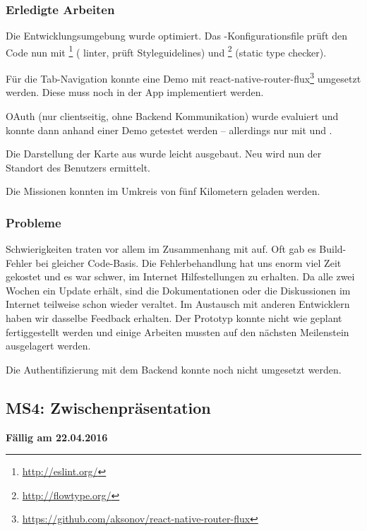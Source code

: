\subsubsection{Erledigte Arbeiten}
Die Entwicklungsumgebung wurde optimiert. Das -Konfigurationsfile prüft den Code nun mit \footnote{\url{http://eslint.org/}} ( linter, prüft Styleguidelines) und \footnote{\url{http://flowtype.org/}} (static type checker). 

Für die Tab-Navigation konnte eine Demo mit react-native-router-flux\footnote{\url{https://github.com/aksonov/react-native-router-flux}} umgesetzt werden. Diese muss noch in der \kort{} App implementiert werden. 

\gls{OAuth} (nur clientseitig, ohne Backend Kommunikation) wurde evaluiert und konnte dann anhand einer Demo getestet werden -- allerdings nur mit  und .

Die Darstellung der Karte aus  wurde leicht ausgebaut. Neu wird nun der Standort des Benutzers ermittelt.

Die Missionen konnten im Umkreis von fünf Kilometern geladen werden.

\subsubsection{Probleme}
Schwierigkeiten traten vor allem im Zusammenhang mit  auf.
Oft gab es Build-Fehler bei gleicher Code-Basis.
Die Fehlerbehandlung hat uns enorm viel Zeit gekostet und es war schwer, im Internet Hilfestellungen zu erhalten.
Da  alle zwei Wochen ein Update erhält, sind die Dokumentationen oder die Diskussionen im Internet teilweise schon wieder veraltet.\newline
Im Austausch mit anderen  Entwicklern haben wir dasselbe Feedback erhalten.\newline
Der Prototyp konnte nicht wie geplant fertiggestellt werden und einige Arbeiten mussten auf den nächsten Meilenstein ausgelagert werden.

Die Authentifizierung mit dem Backend konnte noch nicht umgesetzt werden.

\subsection{MS4: Zwischenpräsentation}
\label{pm-ms4}
\textbf{Fällig am 22.04.2016}

